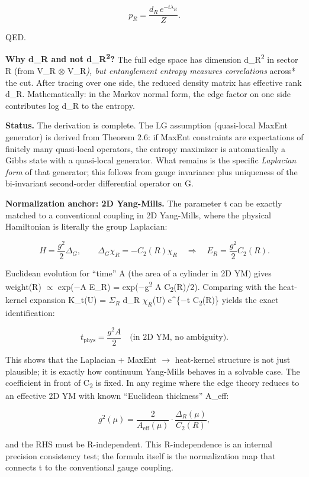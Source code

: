 \documentclass[11pt,a4paper]{article}
\theoremstyle{remark}
\begin{document}
\[
p_R = \frac{d_R \, e^{-t \lambda_R}}{Z}.
\]

QED.

\textbf{Why d\_R and not d\_R\textsuperscript{2}?} The full edge space has dimension d\_R\textsuperscript{2} in
sector R (from V\_R \ensuremath{\otimes} V\_R\emph{), but entanglement entropy measures
correlations }across* the cut. After tracing over one side, the reduced density
matrix has effective rank d\_R. Mathematically: in the Markov normal form, the
edge factor on one side contributes log d\_R to the entropy.

\textbf{Status.} The derivation is complete. The LG assumption (quasi-local MaxEnt
generator) is derived from Theorem 2.6: if MaxEnt constraints are expectations
of finitely many quasi-local operators, the entropy maximizer is automatically
a Gibbs state with a quasi-local generator. What remains is the specific
\emph{Laplacian form} of that generator; this follows from gauge invariance plus
uniqueness of the bi-invariant second-order differential operator on G.

\textbf{Normalization anchor: 2D Yang-Mills.} The parameter t can be exactly
matched to a conventional coupling in 2D Yang-Mills, where the physical
Hamiltonian is literally the group Laplacian:

\[
H = \frac{g^2}{2} \Delta_G, \qquad
\Delta_G \chi_R = -C_2(R) \chi_R
\quad \Rightarrow \quad
E_R = \frac{g^2}{2} C_2(R).
\]

Euclidean evolution for ``time'' A (the area of a cylinder in 2D YM) gives
weight(R) \ensuremath{\propto} exp(\ensuremath{-}A E\_R) = exp(\ensuremath{-}g\textsuperscript{2} A C\textsubscript{2}(R)/2). Comparing with the
heat-kernel expansion K\_t(U) = \(\Sigma_R\) d\_R \(\chi_R\)(U) e\^{}\{\ensuremath{-}t C\textsubscript{2}(R)\} yields the
exact identification:

\[
t_\mathrm{phys} = \frac{g^2 A}{2} \quad \text{(in 2D YM, no ambiguity).}
\]

This shows that the Laplacian + MaxEnt \ensuremath{\to} heat-kernel structure is not just
plausible; it is exactly how continuum Yang-Mills behaves in a solvable case.
The coefficient in front of C\textsubscript{2} is fixed. In any regime where the edge theory
reduces to an effective 2D YM with known ``Euclidean thickness'' A\_eff:

\[
g^2(\mu) = \frac{2}{A_\mathrm{eff}(\mu)} \cdot \frac{\Delta_R(\mu)}{C_2(R)},
\]

and the RHS must be R-independent. This R-independence is an internal
precision consistency test; the formula itself is the normalization map that
connects t to the conventional gauge coupling.
\end{document}
